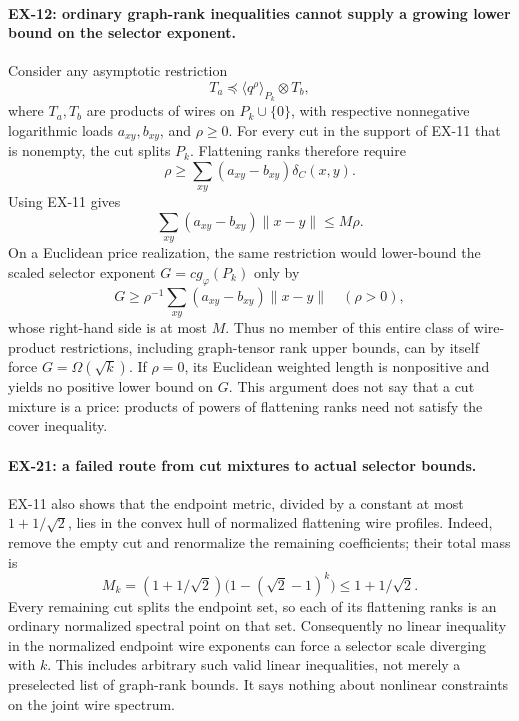 \paragraph{EX-12: ordinary graph-rank inequalities cannot supply a growing
lower bound on the selector exponent.}
Consider any asymptotic restriction
\[
 T_a\preceq \langle q^\rho\rangle_{P_k}\otimes T_b,
\]
where $T_a,T_b$ are products of wires on $P_k\cup\{0\}$, with respective
nonnegative logarithmic loads $a_{xy},b_{xy}$, and $\rho\geq0$.  For every cut
in the support of EX-11 that is nonempty, the cut splits $P_k$.  Flattening ranks
therefore require
\[
 \rho\geq\sum_{xy}(a_{xy}-b_{xy})\delta_C(x,y).
\]
Using EX-11 gives
\[
 \sum_{xy}(a_{xy}-b_{xy})\|x-y\|\leq M\rho.
\]
On a Euclidean price realization, the same restriction would lower-bound the
scaled selector exponent $G=cg_\varphi(P_k)$ only by
\[
 G\geq\rho^{-1}\sum_{xy}(a_{xy}-b_{xy})\|x-y\|
 \quad(\rho>0),
\]
whose right-hand side is at most $M$.  Thus no member of this entire class of
wire-product restrictions, including graph-tensor rank upper bounds, can by
itself force $G=\Omega(\sqrt k)$.  If $\rho=0$, its Euclidean weighted length is
nonpositive and yields no positive lower bound on $G$.  This argument does
not say that a cut mixture is a price: products of powers of flattening ranks
need not satisfy the cover inequality.

\paragraph{EX-21: a failed route from cut mixtures to actual selector bounds.}
EX-11 also shows that the endpoint metric, divided by a constant at most
$1+1/\sqrt2$, lies in the convex hull of normalized flattening wire
profiles. Indeed, remove the empty cut and renormalize the remaining
coefficients; their total mass is
\[
 M_k=(1+1/\sqrt2)\bigl(1-(\sqrt2-1)^k\bigr)\leq1+1/\sqrt2.
\]
Every remaining cut splits the endpoint set, so each of its flattening
ranks is an ordinary normalized spectral point on that set. Consequently
no linear inequality in the normalized endpoint wire exponents can force
a selector scale diverging with $k$. This includes arbitrary such valid
linear inequalities, not merely a preselected list of graph-rank bounds.
It says nothing about nonlinear constraints on the joint wire spectrum.

